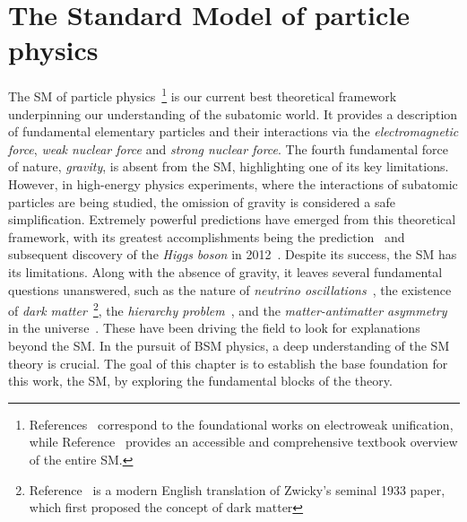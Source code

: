 \chapter{The Standard Model of particle physics}
\thispagestyle{plain}  %
\pagestyle{chapterpages}
\label{Section:Chapter1}

\minitoc

The \ac{SM} of particle physics~\cite{Glashow_1, Weinberg_1, Salam_1, MarkThompson}\footnote{References~\cite{Glashow_1, Weinberg_1, Salam_1} correspond to the foundational works on electroweak unification, while Reference~\cite{MarkThompson} provides an accessible and comprehensive textbook overview of the entire \ac{SM}.} is our current best theoretical framework underpinning our understanding of the subatomic world. It provides a description of fundamental elementary particles and their interactions via the \textit{electromagnetic force}, \textit{weak nuclear force} and \textit{strong nuclear force}. The fourth fundamental force of nature, \textit{gravity}, is absent from the \ac{SM}, highlighting one of its key limitations. However, in high-energy physics experiments, where the interactions of subatomic particles are being studied, the omission of gravity is considered a safe simplification. Extremely powerful predictions have emerged from this theoretical framework, with its greatest accomplishments being the prediction~\cite{Englert_Brout,PeterHiggs_1,PeterHiggs_2, PeterHiggs_3, Guralnik_Hagen_Kibble, Kibble} and subsequent discovery of the \textit{Higgs boson} in 2012~\cite{Higgs_ATLAS,Higgs_CMS}. Despite its success, the \ac{SM} has its limitations. Along with the absence of gravity, it leaves several fundamental questions unanswered, such as the nature of \textit{neutrino oscillations}~\cite{Neutrino_Oscillations, Neutrino_Oscillations_2}, the existence of \textit{dark matter}~\cite{DarkMatter_1,DarkMatter_2,DarkMatter_3}\footnote{Reference~\cite{DarkMatter_1} is a modern English translation of Zwicky's seminal 1933 paper, which first proposed the concept of dark matter}, the \textit{hierarchy problem}~\cite{HierarchyProblem}, and the \textit{matter-antimatter asymmetry} in the universe~\cite{MatterAntimatter}. These have been driving the field to look for explanations beyond the \ac{SM}. In the pursuit of \ac{BSM} physics, a deep understanding of the \ac{SM} theory is crucial. The goal of this chapter is to establish the base foundation for this work, the \ac{SM}, by exploring the fundamental blocks of the theory.

